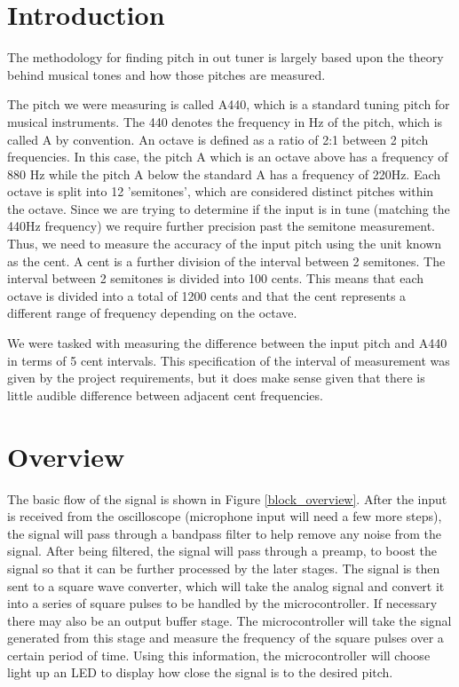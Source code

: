 \documentclass[12pt]{article}
\begin{document}
\newpage
\section{Introduction}


The methodology for finding pitch in out tuner is largely based upon the theory behind musical tones
and how those pitches are measured.

The pitch we were measuring is called A440, which is a standard tuning pitch for musical instruments.
The 440 denotes the frequency in Hz of the pitch, which is called A by convention. An octave is defined
as a ratio of 2:1 between 2 pitch frequencies. In this case, the pitch A which is an octave above has a
frequency of 880 Hz while the pitch A below the standard A has a frequency of 220Hz. Each octave
is split into 12 'semitones', which are considered distinct pitches within the octave. Since we are
trying to determine if the input is in tune (matching the 440Hz frequency) we require further precision
past the semitone measurement. Thus, we need to measure the accuracy of the input pitch using the
unit known as the cent. A cent is a further division of the interval between 2 semitones. The interval
between 2 semitones is divided into 100 cents. This means that each octave is divided into a total of
1200 cents and that the cent represents a different range of frequency depending on the octave.

We were tasked with measuring the difference between the input pitch and A440 in terms of 5 cent
intervals. This specification of the interval of measurement was given by the project requirements, but
it does make sense given that there is little audible difference between adjacent cent frequencies.

\section{Overview}
The basic flow of the signal is shown in Figure \ref{block_overview}. After the input is received from the oscilloscope
(microphone input will need a few more steps), the signal will pass through a bandpass filter to help
remove any noise from the signal. After being filtered, the signal will pass through a preamp, to boost
the signal so that it can be further processed by the later stages. The signal is then sent to a square
wave converter, which will take the analog signal and convert it into a series of square pulses to be
handled by the microcontroller. If necessary there may also be an output buffer stage. The microcontroller
will take the signal generated from this stage and measure the frequency of the square pulses over a certain period of time. Using this information, the
microcontroller will choose light up an LED to display how close the signal is to the desired pitch.
\end{document}
